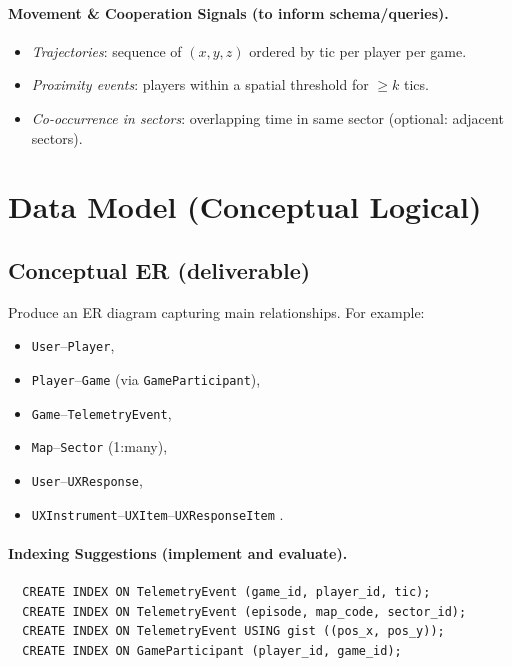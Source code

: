 \documentclass[11pt]{article}
\begin{document}
\paragraph{Movement \& Cooperation Signals (to inform schema/queries).}
\begin{itemize}[leftmargin=*]
  \item \emph{Trajectories}: sequence of $(x,y,z)$ ordered by tic per player per game.
  \item \emph{Proximity events}: players within a spatial threshold for $\geq k$ tics.
  \item \emph{Co-occurrence in sectors}: overlapping time in same sector (optional:
  adjacent sectors).
\end{itemize}

\section{Data Model (Conceptual \textrightarrow Logical)}

\subsection*{Conceptual ER (deliverable)}
Produce an ER diagram capturing main relationships.  For example:

  \begin{itemize}
    \item \texttt{User}--\texttt{Player},
    \item \texttt{Player}--\texttt{Game} (via \texttt{GameParticipant}),
    \item \texttt{Game}--\texttt{TelemetryEvent},
    \item \texttt{Map}--\texttt{Sector} (1:many),
    \item \texttt{User}--\texttt{UXResponse},
    \item \texttt{UXInstrument}--\texttt{UXItem}--\texttt{UXResponseItem} .
  \end{itemize}

\paragraph{Indexing Suggestions (implement and evaluate).}
\begin{verbatim}
  CREATE INDEX ON TelemetryEvent (game_id, player_id, tic);
  CREATE INDEX ON TelemetryEvent (episode, map_code, sector_id);
  CREATE INDEX ON TelemetryEvent USING gist ((pos_x, pos_y));
  CREATE INDEX ON GameParticipant (player_id, game_id);
\end{verbatim}
\end{document}

